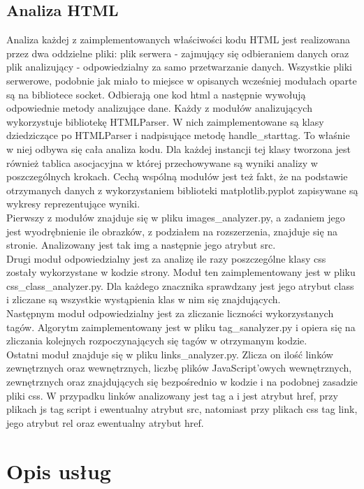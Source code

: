 \documentclass[12pt]{article}
\begin{document}
\subsection{Analiza HTML}
Analiza każdej z zaimplementowanych właściwości kodu HTML jest realizowana przez dwa oddzielne pliki: plik serwera - zajmujący się odbieraniem danych oraz plik analizujący - odpowiedzialny za samo przetwarzanie danych. Wszystkie pliki serwerowe, podobnie jak miało to miejsce w opisanych wcześniej modułach oparte są na bibliotece socket. Odbierają one kod html a następnie wywołują odpowiednie metody analizujące dane. Każdy z modułów analizujących wykorzystuje bibliotekę HTMLParser. W nich zaimplementowane są klasy dziedziczące po HTMLParser i nadpisujące metodę handle\_starttag. To właśnie w niej odbywa się cała analiza kodu. Dla każdej instancji tej klasy tworzona jest również tablica asocjacyjna w której przechowywane są wyniki analizy w poszczególnych krokach. Cechą wspólną modułów jest też fakt, że na podstawie otrzymanych danych z wykorzystaniem biblioteki matplotlib.pyplot zapisywane są wykresy reprezentujące wyniki.\\
Pierwszy z modułów znajduje się w pliku images\_analyzer.py, a zadaniem jego jest wyodrębnienie ile obrazków, z podziałem na rozszerzenia, znajduje się na stronie. Analizowany jest tak img a następnie jego atrybut src.\\
Drugi moduł odpowiedzialny jest za analizę ile razy poszczególne klasy css zostały wykorzystane w kodzie strony. Moduł ten zaimplementowany jest w pliku css\_class\_analyzer.py. Dla każdego znacznika sprawdzany jest jego atrybut class i zliczane są wszystkie wystąpienia klas w nim się znajdujących.\\
Następnym moduł odpowiedzialny jest za zliczanie liczności wykorzystanych tagów. Algorytm zaimplementowany jest w pliku tag\_sanalyzer.py i opiera się na zliczania kolejnych rozpoczynających się tagów w otrzymanym kodzie.\\
Ostatni moduł znajduje się w pliku links\_analyzer.py. Zlicza on ilość linków zewnętrznych oraz wewnętrznych, liczbę plików JavaScript'owych wewnętrznych, zewnętrznych oraz znajdujących się bezpośrednio w kodzie i na podobnej zasadzie pliki css. W przypadku linków analizowany jest tag a i jest atrybut href, przy plikach js tag script i ewentualny atrybut src, natomiast przy plikach css tag link, jego atrybut rel oraz ewentualny atrybut href.

\section{Opis usług}
\end{document}

